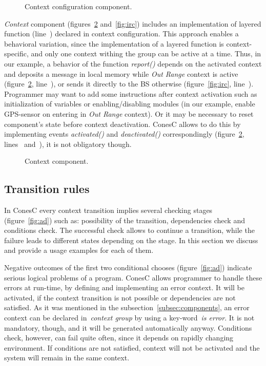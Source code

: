 
\begin{figure}[!h]
\TheSbox
\caption{Context configuration
component.}
\label{fig:ccc}
\end{figure}

\emph{Context} component (figures~\ref{fig:cc} and~\ref{fig:irc}) includes an
implementation of layered function (line~) declared in context configuration. 
This approach enables a behavioral variation, since the implementation of a layered function is
context-specific, and only one context withing the group can be active at a time. Thus, in our
example, a behavior of the function \emph{report()} depends on the activated context and
deposits a message in local memory while \emph{Out Range} context
is active (figure~\ref{fig:cc}, line~),
or sends it directly to the BS otherwise (figure~\ref{fig:irc}, line~).
Programmer may want to add some instructions after
context activation such as initialization of variables or enabling/disabling
modules (in our example, enable GPS-sensor on entering in \emph{Out Range}
context). Or it may be necessary to reset component's state before context
deactivation. ConesC allows to do this by implementing events \emph{activated()} and
\emph{deactivated()} correspondingly (figure~\ref{fig:cc}, lines~
and~), it is not obligatory though.


\begin{figure}[!h]
\TheSbox
\caption{Context component.}
\label{fig:cc}
\end{figure}

\subsection{Transition rules}\label{subsec:rules}

In ConesC every context transition implies several checking stages (figure~\ref{fig:ad}) such as:
possibility of the transition, dependencies check and conditions check. The successful check allows
to continue a transition, while the failure leads to different states depending on the stage. In this
section we discuss and provide a usage examples for each of them. 

Negative outcomes of the first two conditional chooses (figure~\ref{fig:ad}) indicate
serious logical problems of a program. ConesC allows programmer to
handle these errors at run-time, by defining and implementing an error context. It will be activated,
if the context transition is not possible or dependencies are not satisfied. As it was mentioned in
the subsection~\ref{subsec:components}, an error context can be declared
in~\emph{context group} by using a key-word~\emph{is error}. It is not mandatory,
though, and it will be generated automatically anyway. Conditions check, however, can fail quite
often, since it depends on rapidly changing environment. If conditions are not
satisfied, context will not be activated and the system will remain in the same context. 


